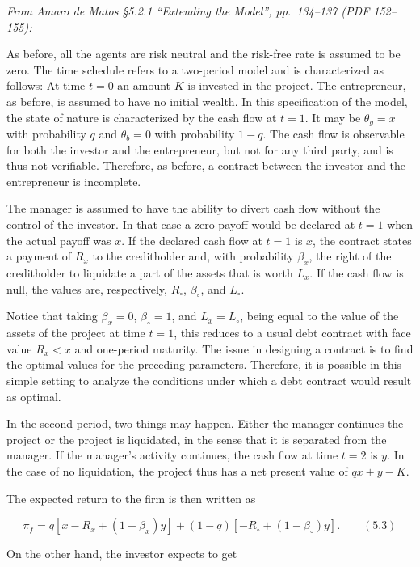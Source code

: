 \documentclass[11pt,a4paper]{article}
\begin{document}
\emph{From Amaro de Matos §5.2.1 ``Extending the Model'', pp.~134--137 (PDF 152--155):}

As before, all the agents are risk neutral and the risk-free rate is assumed to be zero. The time
schedule refers to a two-period model and is characterized as follows: At time \(t = 0\) an amount
\(K\) is invested in the project. The entrepreneur, as before, is assumed to have no initial wealth.
In this specification of the model, the state of nature is characterized by the cash flow at
\(t = 1\). It may be \(\theta_g = x\) with probability \(q\) and \(\theta_b = 0\) with probability
\(1 - q\). The cash flow is observable for both the investor and the entrepreneur, but not for any
third party, and is thus not verifiable. Therefore, as before, a contract between the investor and
the entrepreneur is incomplete.

The manager is assumed to have the ability to divert cash flow without the control of the investor.
In that case a zero payoff would be declared at \(t = 1\) when the actual payoff was \(x\). If the
declared cash flow at \(t = 1\) is \(x\), the contract states a payment of \(R_x\) to the
creditholder and, with probability \(\beta_x\), the right of the creditholder to liquidate a part of
the assets that is worth \(L_x\). If the cash flow is null, the values are, respectively,
\(R_\circ\), \(\beta_\circ\), and \(L_\circ\).

Notice that taking \(\beta_x = 0\), \(\beta_\circ = 1\), and \(L_x = L_\circ\), being equal to the
value of the assets of the project at time \(t = 1\), this reduces to a usual debt contract with
face value \(R_x < x\) and one-period maturity. The issue in designing a contract is to find the
optimal values for the preceding parameters. Therefore, it is possible in this simple setting to
analyze the conditions under which a debt contract would result as optimal.

In the second period, two things may happen. Either the manager continues the project or the project
is liquidated, in the sense that it is separated from the manager. If the manager's activity
continues, the cash flow at time \(t = 2\) is \(y\). In the case of no liquidation, the project thus
has a net present value of \(qx + y - K\).

The expected return to the firm is then written as

\[\pi_f = q[x - R_x + (1 - \beta_x)y] + (1 - q)[-R_\circ + (1 - \beta_\circ)y]. \qquad (5.3)\]

On the other hand, the investor expects to get
\end{document}
